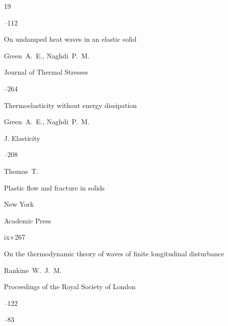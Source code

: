 \begin{thebibliography}{19}

--112





\paper On undamped heat waves in an elastic solid

\by Green~A.~E., Naghdi~P.~M.

\jour Journal of Thermal Stresses




--264





\paper Thermoelasticity without energy dissipation

\by Green~A.~E., Naghdi~P.~M.

\jour J. Elasticity




--208





\by Thomas~T.

\book Plastic flow and fracture in solids

\publaddr New York

\publ Academic Press


\totalpages ix+267




\paper On the thermodynamic theory of waves of finite longitudinal disturbance

\by Rankine~W.~J.~M.

\jour Proceedings of the Royal Society of London



--122

--83



\end{thebibliography}
